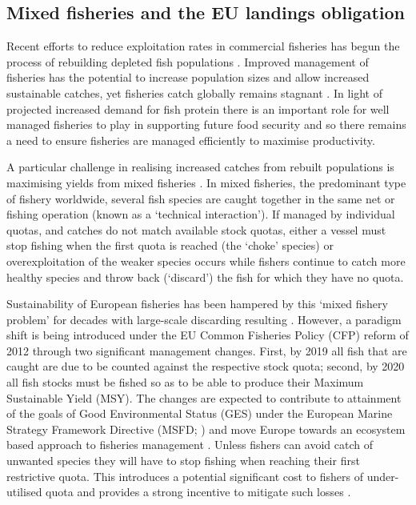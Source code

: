 \documentclass{nature}
\begin{document}
\begin{linenumbers}
\section*{}

\subsection{Mixed fisheries and the EU landings obligation} 

Recent efforts to reduce exploitation rates in commercial fisheries has begun
the process of rebuilding depleted fish populations \cite{Worm2009}.  Improved
management of fisheries has the potential to increase population sizes and
allow increased sustainable catches, yet fisheries catch globally remains
stagnant \cite{FAO2016}. In light of projected increased demand for fish
protein \cite{B??n??2016} there is an important role for well managed fisheries
to play in supporting future food security \cite{Mcclanahan2015} and so there
remains a need to ensure fisheries are managed efficiently to maximise
productivity.

A particular challenge in realising increased catches from rebuilt populations
is maximising yields from mixed fisheries \cite{Branch2008, Kuriyama2016,
	Ulrich2016}. In mixed fisheries, the predominant type
of fishery worldwide, several fish species are caught together in the same net
or fishing operation (known as a `technical interaction'). If managed by
individual quotas, and catches do not match available stock quotas, either a
vessel must stop fishing when the first quota is reached (the `choke' species)
or overexploitation of the weaker species occurs while fishers continue to
catch more healthy species and throw back (`discard') the fish for which they
have no quota.

Sustainability of European fisheries has been hampered by this `mixed fishery
problem' for decades with large-scale discarding resulting \cite{Borges2015,
	Uhlmann2014}.  However, a paradigm shift is being introduced under the
EU Common Fisheries Policy (CFP) reform of 2012 through two significant
management changes.  First, by 2019 all fish that are caught are due to be
counted against the respective stock quota; second, by 2020 all fish stocks
must be fished so as to be able to produce their Maximum Sustainable Yield
(MSY)\cite{EuropeanParliamentandCounciloftheEuropeanUnion2013}. The changes are
expected to contribute to attainment of the goals of Good Environmental Status
(GES) under the European Marine Strategy Framework Directive (MSFD;
\cite{EuropeanParliament2008}) and move Europe towards an ecosystem based
approach to fisheries management \cite{Garcia2003}. Unless fishers can avoid
catch of unwanted species they will have to stop fishing when reaching their
first restrictive quota. This introduces a potential significant cost to
fishers of under-utilised quota\cite{Hoff2010a, Ulrich2016} and provides a
strong incentive to mitigate such losses \cite{Condie2013, Condie2013a}. \\


\end{linenumbers}
\end{document}
